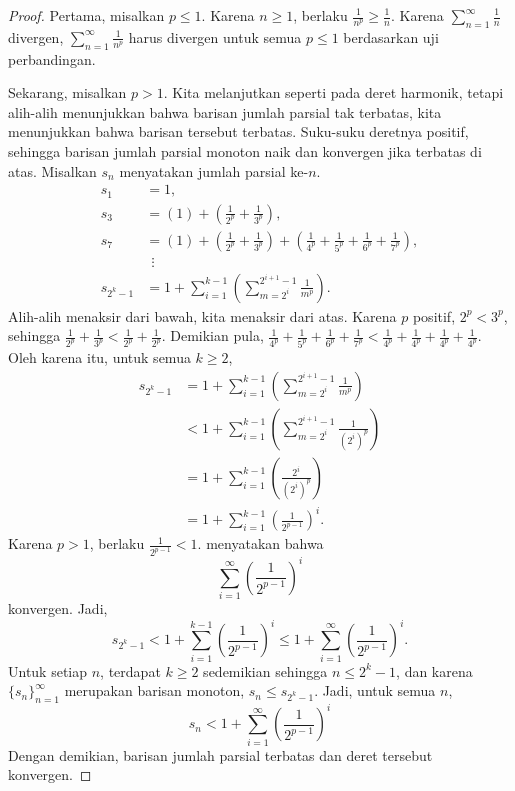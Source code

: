 \begin{proof}
Pertama, misalkan $p \leq 1$.
Karena $n \geq 1$, berlaku
$\frac{1}{n^p} \geq \frac{1}{n}$.  Karena
$\sum_{n=1}^\infty \frac{1}{n}$ divergen,
$\sum_{n=1}^\infty \frac{1}{n^p}$ harus divergen untuk semua $p \leq 1$ berdasarkan uji perbandingan.

Sekarang, misalkan $p > 1$.
Kita melanjutkan seperti pada
deret harmonik, tetapi alih-alih menunjukkan bahwa barisan
jumlah parsial tak terbatas, kita menunjukkan bahwa barisan tersebut terbatas.
Suku-suku deretnya positif, sehingga barisan jumlah parsial
monoton naik dan konvergen jika terbatas
di atas.
Misalkan $s_n$ menyatakan jumlah parsial ke-$n$.
\begin{align*}
 s_1 & = 1 , \\
 s_3 & = \left( 1 \right) + \left( \frac{1}{2^p} + \frac{1}{3^p} \right) , \\
 s_7 & = \left( 1 \right) + \left( \frac{1}{2^p} + \frac{1}{3^p} \right) +
        \left( \frac{1}{4^p} + \frac{1}{5^p} + \frac{1}{6^p} + \frac{1}{7^p} \right) , \\
& ~~ \vdots \\
 s_{2^k - 1} &= 
1 + 
\sum_{i=1}^{k-1}
\left(
\sum_{m=2^i}^{2^{i+1}-1} \frac{1}{m^p}
\right) .
\end{align*}
Alih-alih menaksir dari bawah, kita menaksir dari atas.
Karena $p$ positif, $2^p < 3^p$, sehingga
$\frac{1}{2^p} + \frac{1}{3^p} <
\frac{1}{2^p} + \frac{1}{2^p}$.  Demikian pula,
$\frac{1}{4^p} + \frac{1}{5^p} +
\frac{1}{6^p} + \frac{1}{7^p} <
\frac{1}{4^p} + \frac{1}{4^p} +
\frac{1}{4^p} + \frac{1}{4^p}$.  Oleh karena itu,
untuk semua $k \geq 2$,
\begin{equation*}
\begin{split}
s_{2^k-1}
& =
1+
\sum_{i=1}^{k-1}
\left(
\sum_{m=2^{i}}^{2^{i+1}-1} \frac{1}{m^p}
\right) 
\\
& <
1+
\sum_{i=1}^{k-1}
\left(
\sum_{m=2^{i}}^{2^{i+1}-1} \frac{1}{{(2^i)}^p}
\right) 
\\
& =
1+
\sum_{i=1}^{k-1}
\left(
\frac{2^i}{{(2^i)}^p}
\right) 
\\
& =
1+
\sum_{i=1}^{k-1}
{\left(
\frac{1}{2^{p-1}}
\right)}^i .
\end{split}
\end{equation*}
Karena $p > 1$, berlaku $\frac{1}{2^{p-1}} < 1$.
 menyatakan bahwa
\begin{equation*}
\sum_{i=1}^\infty
{\left(
\frac{1}{2^{p-1}}
\right)}^i
\end{equation*}
konvergen.  Jadi,
\begin{equation*}
s_{2^k-1} < 
1+
\sum_{i=1}^{k-1}
{\left(
\frac{1}{2^{p-1}}
\right)}^i 
\leq 
1+
\sum_{i=1}^\infty
{\left(
\frac{1}{2^{p-1}}
\right)}^i .
\end{equation*}
Untuk setiap $n$, terdapat $k \geq 2$ sedemikian sehingga $n \leq 2^k-1$, dan
karena $\{ s_n \}_{n=1}^\infty$ merupakan barisan monoton, $s_n \leq s_{2^k-1}$.
Jadi, untuk semua $n$,
\begin{equation*}
s_n < 
1+
\sum_{i=1}^\infty
{\left(
\frac{1}{2^{p-1}}
\right)}^i
\end{equation*}
Dengan demikian, barisan jumlah parsial terbatas dan deret tersebut konvergen.
\end{proof}

